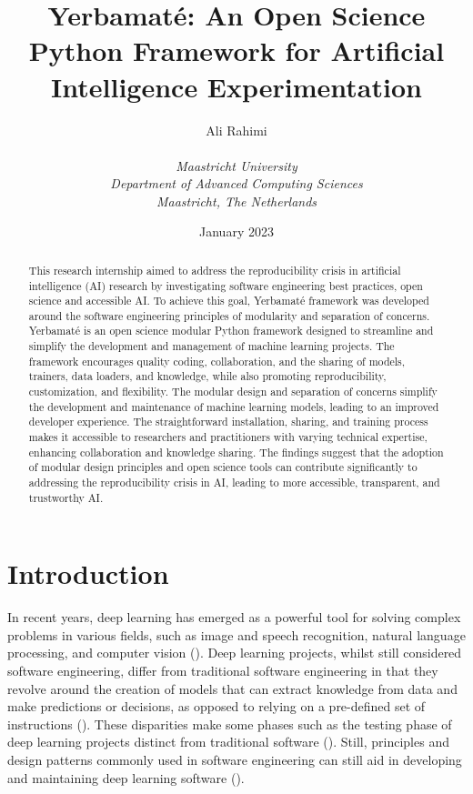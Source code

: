 \documentclass{IEEEtran}
\title{ \Huge \textbf{Yerbamaté: An Open Science Python Framework for Artificial Intelligence Experimentation} \\[0.5cm]}
\author{
\begin{tabular}{ll}
Ali Rahimi
\end{tabular} \bigskip \\

\textit{Maastricht University} \\
\textit{Department of Advanced Computing Sciences}\\
\textit{Maastricht, The Netherlands}\\

}
\date{January 2023}
\newcommand{\note}[1]{\todo[inline]{#1}}
\begin{document}
\maketitle





\begin{abstract}
    This research internship aimed to address the reproducibility crisis in artificial intelligence (AI) research by investigating software engineering best practices, open science and accessible AI. To achieve this goal, Yerbamaté framework was developed around the software engineering principles of modularity and separation of concerns. Yerbamaté is an open science modular Python framework designed to streamline and simplify the development and management of machine learning projects. The framework encourages quality coding, collaboration, and the sharing of models, trainers, data loaders, and knowledge, while also promoting reproducibility, customization, and flexibility. The modular design and separation of concerns simplify the development and maintenance of machine learning models, leading to an improved developer experience. The straightforward installation, sharing, and training process makes it accessible to researchers and practitioners with varying technical expertise, enhancing collaboration and knowledge sharing. The findings suggest that the adoption of modular design principles and open science tools can contribute significantly to addressing the reproducibility crisis in AI, leading to more accessible, transparent, and trustworthy AI.
\end{abstract}

\section{Introduction}

  In recent years, deep learning has emerged as a powerful tool for solving complex problems in various fields, such as image and speech recognition, natural language processing, and computer vision (\cite{lecun2015deep}). 
Deep learning projects, whilst still considered software engineering, differ from traditional software engineering in that they revolve around the creation of models that can extract knowledge from data and make predictions or decisions, as opposed to relying on a pre-defined set of instructions (\cite{lecun2015deep,amershi2019software,wan2019does,se4dl}). These disparities make some phases such as the testing phase of deep learning projects distinct from traditional software (\cite{wan2019does}). Still, principles and design patterns commonly used in software engineering can still aid in developing and maintaining deep learning software (\cite{amershi2019software,wan2019does,se4dl}). 
\end{document}
